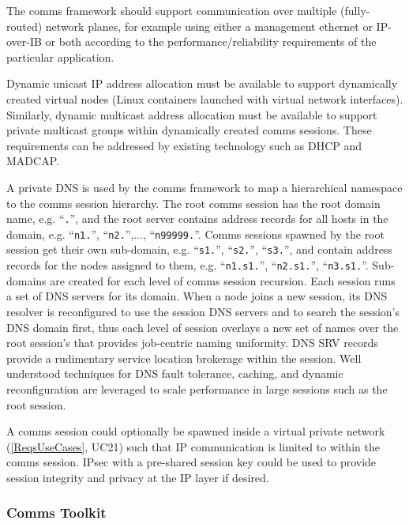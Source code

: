 The comms framework should support communication over multiple
(fully-routed) network planes, for example using either a management
ethernet or IP-over-IB or both according to the performance/reliability
requirements of the particular application.

Dynamic unicast IP address allocation must be available to support
dynamically created virtual nodes (Linux containers launched with
virtual network interfaces).  Similarly,
dynamic multicast address allocation must be available to support
private multicast groups within dynamically created comms sessions.
These requirements can be addressed by existing technology such as
DHCP\cite{rfc2131} and MADCAP\cite{rfc2730}.

A private DNS\cite{rfc1034} is used by the comms framework to
map a hierarchical namespace to the comms session hierarchy.
The root comms session has the root domain name, e.g. ``{\tt \ngrm.}'',
and the root server contains address records for all hosts in the domain, e.g.
``{\tt n1.\ngrm}'', ``{\tt n2.\ngrm}'',..., ``{\tt n99999.\ngrm}''.
Comms sessions spawned by the root session get their own sub-domain, e.g.
``{\tt s1.\ngrm}'', ``{\tt s2.\ngrm}'', ``{\tt s3.\ngrm}'',
and contain address records for the nodes assigned to them, e.g.
``{\tt n1.s1.\ngrm}'', ``{\tt n2.s1.\ngrm}'', ``{\tt n3.s1.\ngrm}''.
Sub-domains are created for each level of comms session recursion.
Each session runs a set of DNS servers for its domain.
When a node joins a new session, its DNS resolver is reconfigured to use
the session DNS servers and to search the session's DNS domain first,
thus each level of session overlays a new set of names over
the root session's that provides job-centric naming uniformity.
DNS SRV records\cite{rfc2782} provide a rudimentary service location
brokerage within the session.
Well understood techniques for DNS fault tolerance,
caching, and dynamic reconfiguration are leveraged to scale performance
in large sessions such as the root session.

A comms session could optionally be spawned inside a virtual private
network (\ref{ReqsUseCases}, UC21) such that IP communication
is limited to within the comms session.  IPsec\cite{rfc2401} with
a pre-shared session key could be used to provide session integrity and
privacy at the IP layer if desired.

\subsubsection{Comms Toolkit}

